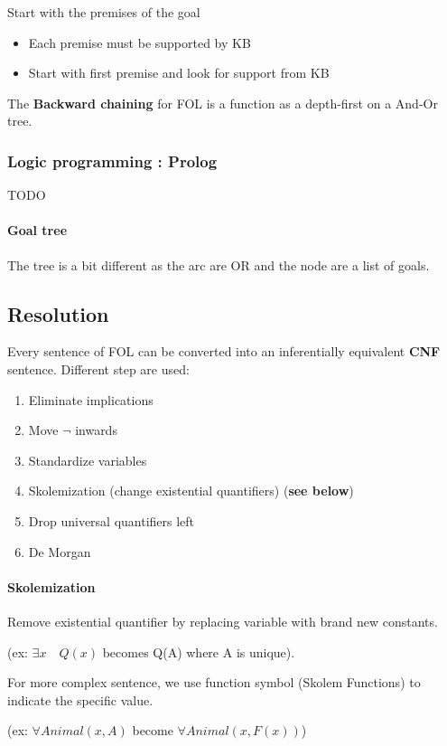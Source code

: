 Start with the premises of the goal
	\begin{itemize}
		\item Each premise must be supported by KB
		\item Start with first premise and look for support from KB 
	\end{itemize}

    The  \textbf{Backward  chaining}   for  FOL  is  a   function  as  a
depth-first on a And-Or tree. 

\subsubsection{Logic programming : Prolog}
TODO

\paragraph{Goal tree} The tree is a bit different as the arc are
OR and the node are a list of goals.

\subsection{Resolution} 
Every sentence of FOL can  be converted into an inferentially equivalent
\textbf{CNF} sentence. Different step are used:
	\begin{enumerate}
		\item Eliminate implications
		\item Move $\neg$ inwards
		\item Standardize variables
        \item Skolemization (change existential quantifiers) (\textbf{see below}) 
		\item Drop universal quantifiers left
		\item De Morgan
	\end{enumerate} 

\paragraph{Skolemization}  Remove  existential quantifier  by  replacing
variable with  brand new  constants.

(ex: $\exists  x \quad Q(x)$  becomes Q(A) where  A is unique).  

For more complex sentence, we  use function symbol (Skolem Functions) to
indicate the specific value.

(ex: $\forall Animal(x, A)$ become $\forall Animal(x, F(x))$)

